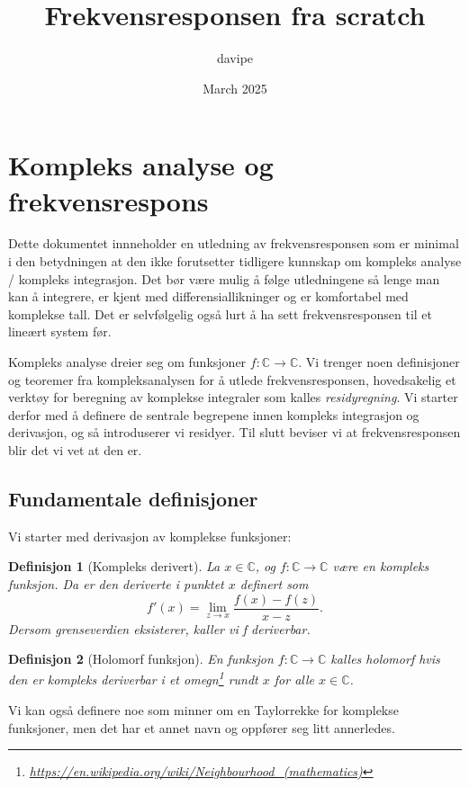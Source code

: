 \documentclass{article}
\title{Frekvensresponsen fra scratch}
\author{davipe }
\date{March 2025}
\newtheorem{definition}{Definisjon}
\begin{document}
\maketitle

\section{Kompleks analyse og frekvensrespons}

Dette dokumentet innneholder en utledning av frekvensresponsen som er minimal i den betydningen at den ikke forutsetter tidligere kunnskap om kompleks analyse / kompleks integrasjon. Det bør være mulig å følge utledningene så lenge man kan å integrere, er kjent med differensiallikninger og er komfortabel med komplekse tall. Det er selvfølgelig også lurt å ha sett frekvensresponsen til et lineært system før.

Kompleks analyse dreier seg om funksjoner $f:\mathbb{C} \longrightarrow \mathbb{C}$. Vi trenger noen definisjoner og teoremer fra kompleksanalysen for å utlede frekvensresponsen, hovedsakelig et verktøy for beregning av komplekse integraler som kalles \textit{residyregning}. Vi starter derfor med å definere de sentrale begrepene innen kompleks integrasjon og derivasjon, og så introduserer vi residyer. Til slutt beviser vi at frekvensresponsen blir det vi vet at den er.

\subsection{Fundamentale definisjoner}

Vi starter med derivasjon av komplekse funksjoner:

\begin{definition}[Kompleks derivert]
    La $x \in \mathbb{C}$, og $f:\mathbb{C} \longrightarrow \mathbb{C}$ være en kompleks funksjon. Da er den deriverte i punktet $x$ definert som \[f'(x) =  \lim_{z \to x} \frac{f(x) - f(z)}{x - z}. \] Dersom grenseverdien eksisterer, kaller vi f deriverbar.
\end{definition}

\begin{definition}[Holomorf funksjon]
    En funksjon $f:\mathbb{C} \longrightarrow \mathbb{C}$ kalles holomorf hvis den er kompleks deriverbar i et omegn\footnote{\url{https://en.wikipedia.org/wiki/Neighbourhood_(mathematics)}} rundt $x$ for alle $x\in\mathbb{C}$.
\end{definition}

Vi kan også definere noe som minner om en Taylorrekke for komplekse funksjoner, men det har et annet navn og oppfører seg litt annerledes.
\end{document}
